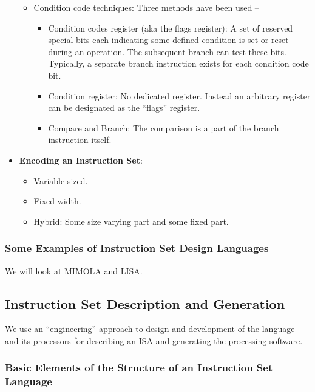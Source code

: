 \begin{itemize}
\begin{itemize}
  \item Condition code techniques: Three methods have been used --
    \begin{itemize}
    \item Condition codes register (aka  the flags register): A set of
      reserved special bits each  indicating some defined condition is
      set or  reset during  an operation.   The subsequent  branch can
      test  these  bits.   Typically, a  separate  branch  instruction
      exists for each condition code bit.
    \item  Condition  register:  No dedicated  register.   Instead  an
      arbitrary register can be designated as the ``flags'' register.
    \item Compare and  Branch: The comparison is a part  of the branch
      instruction itself.
    \end{itemize}
  \end{itemize}
\item \textbf{Encoding an Instruction Set}:
  \begin{itemize}
  \item Variable sized.
  \item Fixed width.
  \item Hybrid: Some size varying part and some fixed part.
  \end{itemize}
\end{itemize}

\subsubsection{Some Examples of Instruction Set Design Languages}
\label{sec:isa:design:lang:eg}

We will look at MIMOLA and LISA.

\subsection{Instruction Set Description and Generation}
\label{sec:describe:generate:isa}

We use  an ``engineering'' approach  to design and development  of the
language and its  processors for describing an ISA  and generating the
processing software.

\subsubsection{Basic Elements  of the Structure of  an Instruction Set
  Language}
\label{sec:isa:lang:struct}


